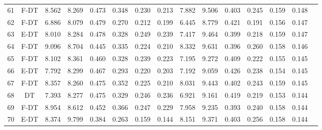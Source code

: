\begin{longtable}{@{\hskip3pt}c@{\hskip3pt}c@{\hskip3pt}c@{\hskip3pt}c@{\hskip3pt}c@{\hskip3pt}c@{\hskip3pt}c@{\hskip3pt}c@{\hskip3pt}c@{\hskip3pt}c@{\hskip3pt}c@{\hskip3pt}c@{\hskip3pt}c@{\hskip3pt}c@{\hskip3pt}c}
         61 &           F-DT &             8.562 &       8.269 &         0.473 &       0.348 &       0.230 &        0.213 &               7.882 &       9.506 &         0.403 &       0.245 &       0.159 &        0.148 \\
         62 &           F-DT &             6.886 &       8.079 &         0.479 &       0.270 &       0.212 &        0.199 &               6.445 &       8.779 &         0.421 &       0.191 &       0.156 &        0.147 \\
         63 &           E-DT &             8.010 &       8.284 &         0.478 &       0.328 &       0.249 &        0.239 &               7.417 &       9.464 &         0.399 &       0.218 &       0.159 &        0.147 \\
         64 &           F-DT &             9.096 &       8.704 &         0.445 &       0.335 &       0.224 &        0.210 &               8.332 &       9.631 &         0.396 &       0.260 &       0.158 &        0.146 \\
         65 &           F-DT &             8.102 &       8.361 &         0.460 &       0.328 &       0.239 &        0.223 &               7.195 &       9.272 &         0.409 &       0.222 &       0.155 &        0.145 \\
         66 &           E-DT &             7.792 &       8.299 &         0.467 &       0.293 &       0.220 &        0.203 &               7.192 &       9.059 &         0.426 &       0.238 &       0.154 &        0.145 \\
         67 &           F-DT &             8.357 &       8.260 &         0.475 &       0.352 &       0.225 &        0.210 &               8.031 &       9.443 &         0.402 &       0.243 &       0.159 &        0.145 \\
         68 &             DT &             7.393 &       8.277 &         0.475 &       0.329 &       0.246 &        0.236 &               6.921 &       9.161 &         0.419 &       0.219 &       0.153 &        0.144 \\
         69 &           F-DT &             8.954 &       8.612 &         0.452 &       0.366 &       0.247 &        0.229 &               7.958 &       9.235 &         0.393 &       0.240 &       0.158 &        0.144 \\
         70 &           E-DT &             8.374 &       9.799 &         0.384 &       0.263 &       0.159 &        0.144 &               8.151 &       9.371 &         0.403 &       0.256 &       0.158 &        0.144 \\

\end{longtable}
